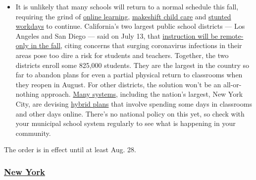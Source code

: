 \begin{itemize}
  \begin{itemize}
  \tightlist
  \item
    It is unlikely that many schools will return to a normal schedule
    this fall, requiring the grind of
    \href{https://www.nytimes3xbfgragh.onion/2020/06/05/us/coronavirus-education-lost-learning.html?action=click\&pgtype=Article\&state=default\&region=MAIN_CONTENT_3\&context=storylines_faq}{online
    learning},
    \href{https://www.nytimes3xbfgragh.onion/2020/05/29/us/coronavirus-child-care-centers.html?action=click\&pgtype=Article\&state=default\&region=MAIN_CONTENT_3\&context=storylines_faq}{makeshift
    child care} and
    \href{https://www.nytimes3xbfgragh.onion/2020/06/03/business/economy/coronavirus-working-women.html?action=click\&pgtype=Article\&state=default\&region=MAIN_CONTENT_3\&context=storylines_faq}{stunted
    workdays} to continue. California's two largest public school
    districts --- Los Angeles and San Diego --- said on July 13, that
    \href{https://www.nytimes3xbfgragh.onion/2020/07/13/us/lausd-san-diego-school-reopening.html?action=click\&pgtype=Article\&state=default\&region=MAIN_CONTENT_3\&context=storylines_faq}{instruction
    will be remote-only in the fall}, citing concerns that surging
    coronavirus infections in their areas pose too dire a risk for
    students and teachers. Together, the two districts enroll some
    825,000 students. They are the largest in the country so far to
    abandon plans for even a partial physical return to classrooms when
    they reopen in August. For other districts, the solution won't be an
    all-or-nothing approach.
    \href{https://bioethics.jhu.edu/research-and-outreach/projects/eschool-initiative/school-policy-tracker/}{Many
    systems}, including the nation's largest, New York City, are
    devising
    \href{https://www.nytimes3xbfgragh.onion/2020/06/26/us/coronavirus-schools-reopen-fall.html?action=click\&pgtype=Article\&state=default\&region=MAIN_CONTENT_3\&context=storylines_faq}{hybrid
    plans} that involve spending some days in classrooms and other days
    online. There's no national policy on this yet, so check with your
    municipal school system regularly to see what is happening in your
    community.
  \end{itemize}
\end{itemize}

The order is in effect until at least Aug. 28.

\hypertarget{new-york}{%
\subsubsection{\texorpdfstring{\href{https://coronavirus.health.ny.gov/covid-19-travel-advisory}{New
York}}{New York}}\label{new-york}}

